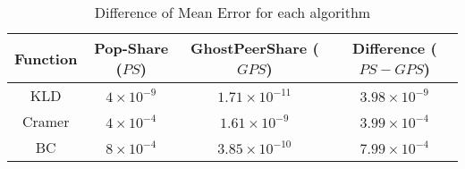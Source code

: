 \begin{table}[t]
\caption{Difference of Mean Error for each algorithm}
\centering
\begin{tabular}{|c|c|c|c|}
\hline
\textbf{Function} & \textbf{Pop-Share ($PS$)} & \textbf{GhostPeerShare ($GPS$)} & \textbf{Difference ($PS-GPS$)} \\
\hline
KLD     & $4 \times 10^{-9}$ & $1.71 \times 10^{-11}$ & $3.98 \times 10^{-9}$ \\
Cramer  & $4 \times 10^{-4}$ & $1.61 \times 10^{-9}$ & $3.99 \times 10^{-4}$ \\
BC      & $8 \times 10^{-4}$ & $3.85 \times 10^{-10}$ & $7.99 \times 10^{-4}$ \\
\hline
\end{tabular}
\label{table:mean-error}
\end{table}
